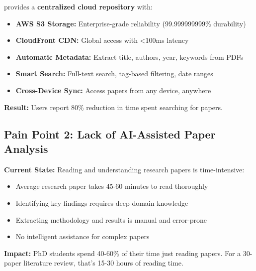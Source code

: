 \begin{successbox}
\projectname{} provides a \textbf{centralized cloud repository} with:
\begin{itemize}
    \item \textbf{AWS S3 Storage:} Enterprise-grade reliability (99.999999999\% durability)
    \item \textbf{CloudFront CDN:} Global access with <100ms latency
    \item \textbf{Automatic Metadata:} Extract title, authors, year, keywords from PDFs
    \item \textbf{Smart Search:} Full-text search, tag-based filtering, date ranges
    \item \textbf{Cross-Device Sync:} Access papers from any device, anywhere
\end{itemize}

\textbf{Result:} Users report 80\% reduction in time spent searching for papers.
\end{successbox}

\subsection{Pain Point 2: Lack of AI-Assisted Paper Analysis}
\label{subsec:pain-ai-analysis}

\begin{warningbox}
\textbf{Current State:} Reading and understanding research papers is time-intensive:
\begin{itemize}
    \item Average research paper takes 45-60 minutes to read thoroughly
    \item Identifying key findings requires deep domain knowledge
    \item Extracting methodology and results is manual and error-prone
    \item No intelligent assistance for complex papers
\end{itemize}

\textbf{Impact:} PhD students spend 40-60\% of their time just reading papers. For a 30-paper literature review, that's 15-30 hours of reading time.
\end{warningbox}

